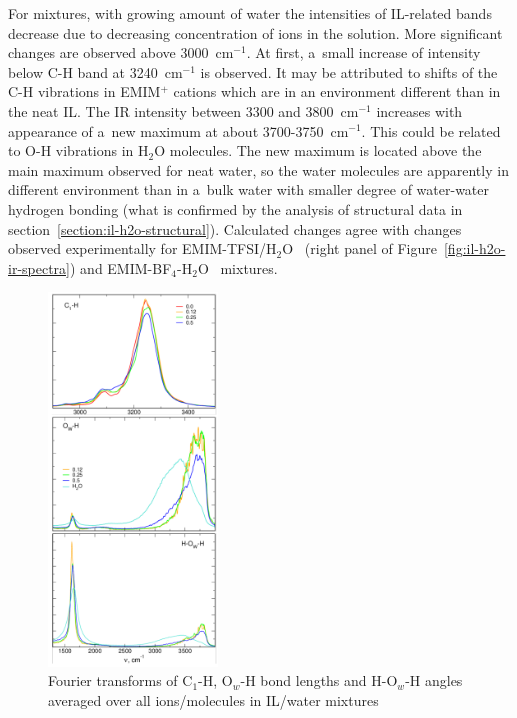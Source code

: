 For mixtures, with growing amount of water the intensities of IL-related bands decrease due to decreasing concentration of ions in the solution. More significant changes are observed above 3000~cm$^{-1}$. At first, a~small increase of intensity below C-H band at 3240~cm$^{-1}$ is observed. It may be attributed to shifts of the C-H vibrations in EMIM$^{+}$ cations which are in an environment different than in the neat IL. The IR intensity between 3300 and 3800~cm$^{-1}$ increases with appearance of a~new maximum at about 3700-3750~cm$^{-1}$. This could be related to O-H vibrations in H$_2$O molecules. The new maximum is located above the main maximum observed for neat water, so the water molecules are apparently in different environment than in a~bulk water with smaller degree of water-water hydrogen bonding (what is confirmed by the analysis of structural data in section~\ref{section:il-h2o-structural}). Calculated changes agree with changes observed experimentally for EMIM-TFSI/H$_2$O~\cite{experimental-ir-emim-tfsi-h2o} (right panel of Figure~\ref{fig:il-h2o-ir-spectra}) and EMIM-BF$_4$-H$_2$O~\cite{experimental-ir-emim-bf4-h2o} mixtures.

\begin{figure}[ht]
    \centering
    \includegraphics[width=0.4\textwidth]{img/4-ir-spectra-from-aimd-simulations/4-il-h2o/fourier-averages.png}
    \caption{Fourier transforms of C$_1$-H, O$_w$-H bond lengths and H-O$_w$-H angles averaged over all ions/molecules in IL/water mixtures}
    \label{fig:il-h2o-fourier-averages}
\end{figure}

